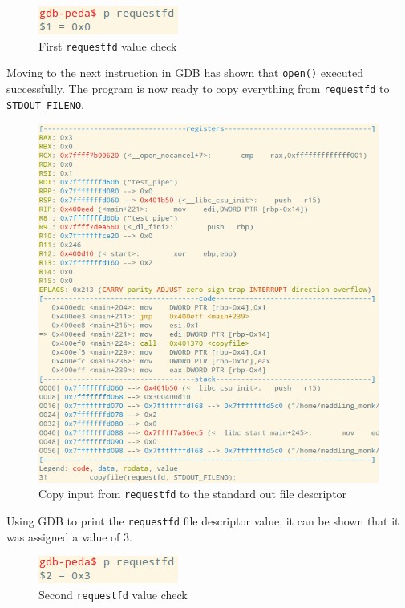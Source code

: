 \documentclass[letter,12pt,sffamily]{article}
\begin{document}
\begin{figure}[H]
	\centering
	\includegraphics[width=0.3\linewidth]{./images/5}
	\caption[requestfd_val_check_1]{First \texttt{requestfd} value check}
	\label{fig:5}
\end{figure}
Moving to the next instruction in GDB has shown that \texttt{open()} executed successfully. The program is now ready to copy everything from \texttt{requestfd} to \texttt{STDOUT_FILENO}.
\begin{figure}[H]
	\centering
	\includegraphics[width=1\linewidth]{./images/6}
	\caption[copyfile]{Copy input from \texttt{requestfd} to the standard out file descriptor}
	\label{fig:6}
\end{figure}
Using GDB to print the \texttt{requestfd} file descriptor value, it can be shown that it was assigned a value of 3.
\begin{figure}[H]
	\centering
	\includegraphics[width=0.3\linewidth]{./images/7}
	\caption[requestfd_val_check_2]{Second \texttt{requestfd} value check}
	\label{fig:7}
\end{figure}
\end{document}
